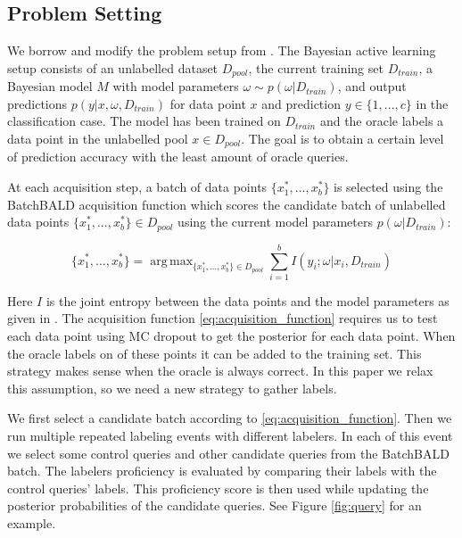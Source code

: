 \documentclass[twoside,11pt]{article}
\DeclareMathOperator*{\argmax}{arg\,max}
\begin{document}
\subsection{Problem Setting}

We borrow and modify the problem setup from \cite{kirsch2019batchbald}. The Bayesian active learning setup consists of an unlabelled dataset $D_{pool}$, the current training set $D_{train}$, a Bayesian model $M$ with model parameters $\omega \sim p(\omega | D_{train})$, and output predictions $p(y|x, \omega, D_{train})$ for data point $x$ and prediction $y \in \{1, ..., c\}$ in the classification case. The model has been trained on $D_{train}$ and the oracle labels a data point in the unlabelled pool $x \in D_{pool}$. The goal is to obtain a certain level of prediction accuracy with the least amount of oracle queries.

At each acquisition step, a batch of data points $\{x^*_1, ..., x^*_b\}$ is selected using the BatchBALD acquisition function which scores the candidate batch of unlabelled data points $\{x^*_1, ..., x^*_b\} \in D_{pool} $ using the current model parameters $p(\omega|D_{train})$:

\begin{equation}
    \{x^*_1, ..., x^*_b\} = \argmax_{\{x^*_1, ..., x^*_b\} \in D_{pool}} \sum^b_{i=1} I(y_i; \omega | x_i, D_{train})
    \label{eq:acquisition_function}
\end{equation}

Here $I$ is the joint entropy between the data points and the model parameters as given in \cite{kirsch2019batchbald}. The acquisition function \eqref{eq:acquisition_function} requires us to test each data point using MC dropout to get the posterior for each data point. When the oracle labels on of these points it can be added to the training set. This strategy makes sense when the oracle is always correct. In this paper we relax this assumption, so we need a new strategy to gather labels.
 
We first select a candidate batch according to \eqref{eq:acquisition_function}. Then we run multiple repeated labeling events with different labelers. In each of this event we select some control queries and other candidate queries from the BatchBALD batch. The labelers proficiency is evaluated by comparing their labels with the control queries' labels. This proficiency score is then used while updating the posterior probabilities of the candidate queries. See Figure \ref{fig:query} for an example.
\end{document}
